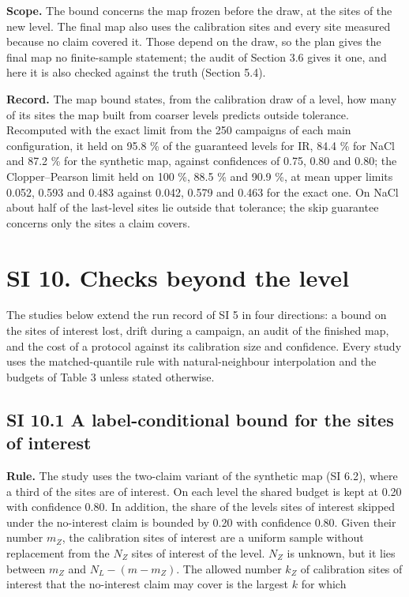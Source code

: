\documentclass{iopjournal}
\begin{document}
\textbf{Scope.} The bound concerns the map frozen before the draw, at the sites of the new level. The final map also uses the calibration sites and every site measured because no claim covered it. Those depend on the draw, so the plan gives the final map no finite-sample statement; the audit of Section 3.6 gives it one, and here it is also checked against the truth (Section 5.4).

\textbf{Record.} The map bound states, from the calibration draw of a level, how many of its sites the map built from coarser levels predicts outside tolerance. Recomputed with the exact limit from the 250 campaigns of each main configuration, it held on 95.8 \% of the guaranteed levels for IR, 84.4 \% for NaCl and 87.2 \% for the synthetic map, against confidences of 0.75, 0.80 and 0.80; the Clopper--Pearson limit held on 100 \%, 88.5 \% and 90.9 \%, at mean upper limits 0.052, 0.593 and 0.483 against 0.042, 0.579 and 0.463 for the exact one. On NaCl about half of the last-level sites lie outside that tolerance; the skip guarantee concerns only the sites a claim covers.

\hypertarget{si-10.-checks-beyond-the-level}{%
\section*{SI 10. Checks beyond the level}\label{si-10.-checks-beyond-the-level}}

The studies below extend the run record of SI 5 in four directions: a bound on the sites of interest lost, drift during a campaign, an audit of the finished map, and the cost of a protocol against its calibration size and confidence. Every study uses the matched-quantile rule with natural-neighbour interpolation and the budgets of Table 3 unless stated otherwise.

\hypertarget{si-10.1-a-label-conditional-bound-for-the-sites-of-interest}{%
\subsection*{SI 10.1 A label-conditional bound for the sites of interest}\label{si-10.1-a-label-conditional-bound-for-the-sites-of-interest}}

\textbf{Rule.} The study uses the two-claim variant of the synthetic map (SI 6.2), where a third of the sites are of interest. On each level the shared budget is kept at 0.20 with confidence 0.80. In addition, the share of the level\textquotesingle s sites of interest skipped under the no-interest claim is bounded by 0.20 with confidence 0.80. Given their number \(m_Z\), the calibration sites of interest are a uniform sample without replacement from the \(N_Z\) sites of interest of the level. \(N_Z\) is unknown, but it lies between \(m_Z\) and \(N_L - (m - m_Z)\). The allowed number \(k_Z\) of calibration sites of interest that the no-interest claim may cover is the largest \(k\) for which
\end{document}

